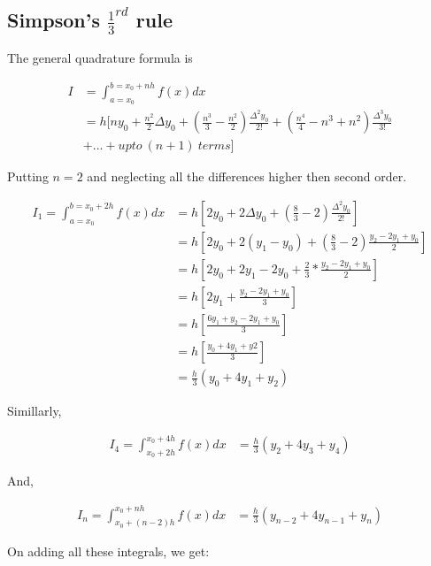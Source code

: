 \documentclass[11pt, a4paper, oneside]{book}
\begin{document}
        \subsection{Simpson's $\frac{1}{3}^{rd}$ rule}
          The general quadrature formula is

          \begin{align*}
            I &=\int_{a=x_0}^{b=x_0+nh}f(x)dx\\
              &= h[ny_0+\frac{n^2}{2}\Delta y_0+(\frac{n^3}{3}-\frac{n^2}{2})\frac{\Delta^2y_0}{2!}+(\frac{n^4}{4}-n^3+n^2)\frac{\Delta^3y_0}{3!}\\
              &+ \dots+upto\ (n+1)\ terms]
          \end{align*}

          Putting $n=2$ and neglecting all the differences higher then second order.

          \begin{align*}
            I_1=\int_{a=x_0}^{b=x_0+2h}f(x)dx &= h[2y_0+2\Delta y_0+(\frac{8}{3}-2)\frac{\Delta^2y_0}{2!}]\\
                                              &= h[2y_0+2(y_1-y_0)+(\frac{8}{3}-2)\frac{y_2-2y_1+y_0}{2}]\\
                                              &= h[2y_0+2y_1-2y_0+\frac{2}{3}*\frac{y_2-2y_1+y_0}{2}]\\
                                              &= h[2y_1+\frac{y_2-2y_1+y_0}{3}]\\
                                              &= h[\frac{6y_1+y_2-2y_1+y_0}{3}]\\
                                              &= h[\frac{y_0+4y_1+y2}{3}]\\
                                              &= \frac{h}{3}(y_0+4y_1+y_2)
          \end{align*}

          Simillarly,

          \begin{align*}
            I_4=\int_{x_0+2h}^{x_0+4h}f(x)dx &= \frac{h}{3}(y_2+4y_3+y_4)
          \end{align*}

          And,

          \begin{align*}
            I_n=\int_{x_0+(n-2)h}^{x_0+nh}f(x)dx &= \frac{h}{3}(y_{n-2}+4y_{n-1}+y_n)
          \end{align*}

          On adding all these integrals, we get:
\end{document}
